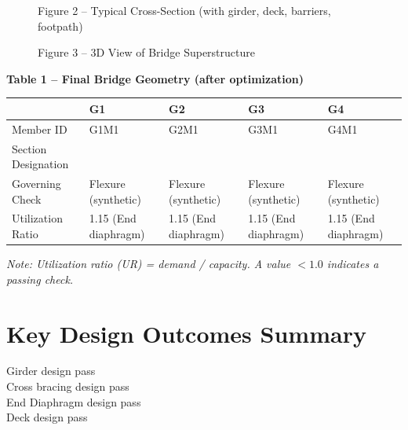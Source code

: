 \documentclass[12pt,a4paper]{report}
\numberwithin{table}{chapter}
\numberwithin{figure}{chapter}
\begin{document}
\newpage

\begin{figure}[H]
\centering
{}
\caption*{Figure 2 -- Typical Cross-Section (with girder, deck, barriers, footpath)}
\end{figure}

\begin{figure}[H]
\centering
{}
\caption*{Figure 3 -- 3D View of Bridge Superstructure}
\end{figure}

\noindent\textbf{Table 1 -- Final Bridge Geometry (after optimization)}

\vspace{0.4em}
\noindent
\begin{tabular}{|C{2.8cm}|C{3.0cm}|C{3.0cm}|C{3.0cm}|C{3.0cm}|}
\hline
  \textbf{} &
  \textbf{G1} &
  \textbf{G2} &
  \textbf{G3} &
  \textbf{G4} \\
\hline
Member ID & G1M1 & G2M1 & G3M1 & G4M1 \\
\hline
Section Designation &  &  &  &  \\
\hline
Governing Check & Flexure (synthetic) & Flexure (synthetic) & Flexure (synthetic) & Flexure (synthetic) \\
\hline
Utilization Ratio & 1.15 (End diaphragm) & 1.15 (End diaphragm) & 1.15 (End diaphragm) & 1.15 (End diaphragm) \\
\hline
\end{tabular}

\vspace{0.4em}
\noindent\textit{Note: Utilization ratio (UR) = demand / capacity. A value $< 1.0$ indicates a passing check.}

\vspace{1em}

\section*{Key Design Outcomes Summary}
\label{sec:key-outcomes}

\noindent Girder design pass \\
Cross bracing design pass \\
End Diaphragm design pass \\
Deck design pass
\end{document}
